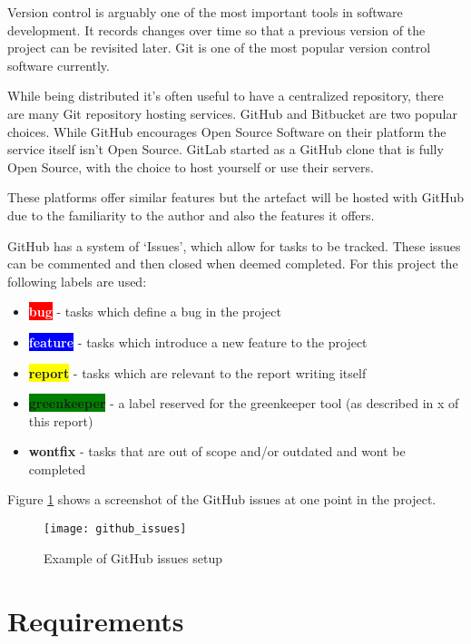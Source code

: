 Version control is arguably one of the most important tools in software development. It records changes over time so that a previous version of the project can be revisited later. Git is one of the most popular version control software currently. \cite{git}

While being distributed it's often useful to have a centralized repository, there are many Git repository hosting services. GitHub and Bitbucket are two popular choices. While GitHub encourages Open Source Software on their platform the service itself isn't Open Source. \cite{github} GitLab started as a GitHub clone that is fully Open Source, with the choice to host yourself or use their servers. \cite{gitlab} \cite{bitbucket}

These platforms offer similar features but the artefact will be hosted with GitHub due to the familiarity to the author and also the features it offers.

GitHub has a system of `Issues', which allow for tasks to be tracked. These issues can be commented and then closed when deemed completed. For this project the following labels are used:

\begin{itemize}
  \item \textbf{\colorbox{red}{\textcolor{white}{bug}}} - tasks which define a bug in the project
  \item \textbf{\colorbox{blue}{\textcolor{white}{feature}}} -  tasks which introduce a new feature to the project
  \item \textbf{\colorbox{yellow}{report}} - tasks which are relevant to the report writing itself
  \item \textbf{\colorbox{green}{greenkeeper}} - a label reserved for the greenkeeper tool (as described in x of this report)
  \item \textbf{wontfix} - tasks that are out of scope and/or outdated and wont be completed
\end{itemize}

Figure \ref{figure-github-issues} shows a screenshot of the GitHub issues at one point in the project.

\begin{figure}[H]
  \centering
    \texttt{[image: github\_issues]}
  \caption{Example of GitHub issues setup}
  \label{figure-github-issues}
\end{figure}

\section{Requirements} \label{a-d--requirements}

